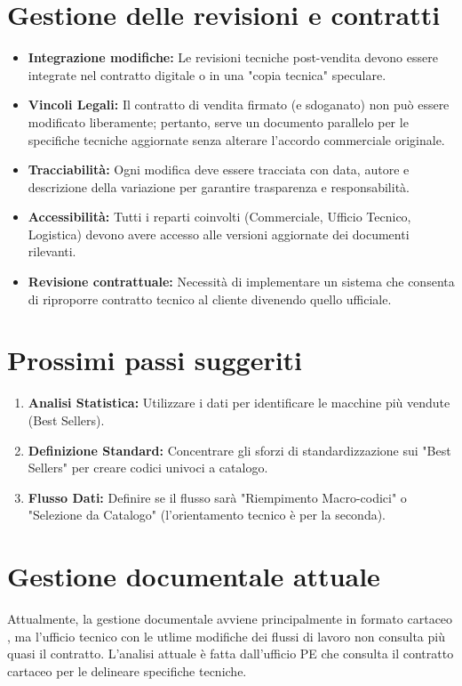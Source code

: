 \documentclass[12pt, a4paper]{article} %
\begin{document}
\section{Gestione delle revisioni e contratti}
\begin{itemize} 
    \item \textbf{Integrazione modifiche:} Le revisioni tecniche post-vendita devono essere integrate nel contratto digitale o in una "copia tecnica" speculare.
    \item \textbf{Vincoli Legali:} Il contratto di vendita firmato (e sdoganato) non può essere modificato liberamente; pertanto, serve un documento parallelo per le specifiche tecniche aggiornate senza alterare l'accordo commerciale originale.
    \item \textbf{Tracciabilità:} Ogni modifica deve essere tracciata con data, autore e descrizione della variazione per garantire trasparenza e responsabilità.
    \item \textbf{Accessibilità:} Tutti i reparti coinvolti (Commerciale, Ufficio Tecnico, Logistica) devono avere accesso alle versioni aggiornate dei documenti rilevanti.
    \item \textbf{Revisione contrattuale:} Necessità di implementare un sistema che consenta di riproporre contratto tecnico al cliente divenendo quello ufficiale.
\end{itemize}

\section{Prossimi passi suggeriti}
\begin{enumerate}
    \item \textbf{Analisi Statistica:} Utilizzare i dati per identificare le macchine più vendute (Best Sellers).
    \item \textbf{Definizione Standard:} Concentrare gli sforzi di standardizzazione sui "Best Sellers" per creare codici univoci a catalogo.
    \item \textbf{Flusso Dati:} Definire se il flusso sarà "Riempimento Macro-codici" o "Selezione da Catalogo" (l'orientamento tecnico è per la seconda).
\end{enumerate}

\section{Gestione documentale attuale}
Attualmente, la gestione documentale avviene principalmente in formato cartaceo
, ma l'ufficio tecnico con le utlime modifiche dei flussi di lavoro non
consulta più quasi il contratto. L'analisi attuale è fatta dall'ufficio PE che
consulta il contratto cartaceo per le delineare specifiche tecniche.
\end{document}
